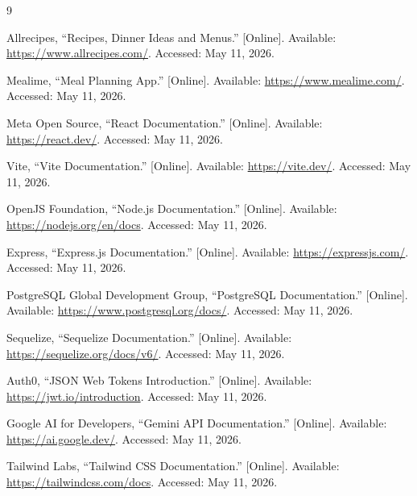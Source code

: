 \documentclass[11pt,a4paper]{article}
\begin{document}

\begin{thebibliography}{9}

Allrecipes, ``Recipes, Dinner Ideas and Menus.'' [Online]. Available: \url{https://www.allrecipes.com/}. Accessed: May 11, 2026.

Mealime, ``Meal Planning App.'' [Online]. Available: \url{https://www.mealime.com/}. Accessed: May 11, 2026.

Meta Open Source, ``React Documentation.'' [Online]. Available: \url{https://react.dev/}. Accessed: May 11, 2026.

Vite, ``Vite Documentation.'' [Online]. Available: \url{https://vite.dev/}. Accessed: May 11, 2026.

OpenJS Foundation, ``Node.js Documentation.'' [Online]. Available: \url{https://nodejs.org/en/docs}. Accessed: May 11, 2026.

Express, ``Express.js Documentation.'' [Online]. Available: \url{https://expressjs.com/}. Accessed: May 11, 2026.

PostgreSQL Global Development Group, ``PostgreSQL Documentation.'' [Online]. Available: \url{https://www.postgresql.org/docs/}. Accessed: May 11, 2026.

Sequelize, ``Sequelize Documentation.'' [Online]. Available: \url{https://sequelize.org/docs/v6/}. Accessed: May 11, 2026.

Auth0, ``JSON Web Tokens Introduction.'' [Online]. Available: \url{https://jwt.io/introduction}. Accessed: May 11, 2026.

Google AI for Developers, ``Gemini API Documentation.'' [Online]. Available: \url{https://ai.google.dev/}. Accessed: May 11, 2026.

Tailwind Labs, ``Tailwind CSS Documentation.'' [Online]. Available: \url{https://tailwindcss.com/docs}. Accessed: May 11, 2026.

\end{thebibliography}


\newpage

\newpage

\newpage

\end{document}
